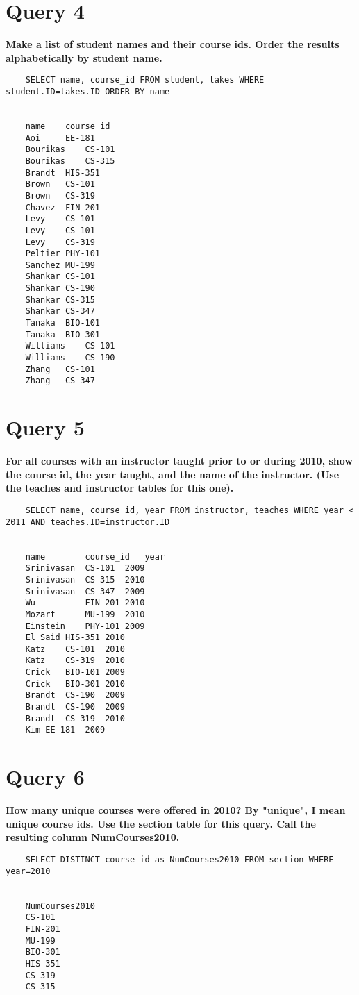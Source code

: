 \documentclass[letterpaper]{article}
\begin{document}
\section{Query 4}

    \textbf{Make a list of student names and their course ids.  Order the results alphabetically by student name.}
    \begin{lstlisting}
    SELECT name, course_id FROM student, takes WHERE student.ID=takes.ID ORDER BY name


    name   	course_id	
    Aoi	    EE-181	
    Bourikas	CS-101	
    Bourikas	CS-315	
    Brandt	HIS-351	
    Brown	CS-101	
    Brown	CS-319	
    Chavez	FIN-201	
    Levy	CS-101	
    Levy	CS-101	
    Levy	CS-319	
    Peltier	PHY-101	
    Sanchez	MU-199	
    Shankar	CS-101	
    Shankar	CS-190	
    Shankar	CS-315	
    Shankar	CS-347	
    Tanaka	BIO-101	
    Tanaka	BIO-301	
    Williams	CS-101	
    Williams	CS-190	
    Zhang	CS-101	
    Zhang	CS-347
    \end{lstlisting}
        
\section{Query 5}

    \textbf{For all courses with an instructor taught prior to or during 2010, show the course id, the year taught, and the name of the instructor.  (Use the teaches and instructor tables for this one).}
    \begin{lstlisting}
    SELECT name, course_id, year FROM instructor, teaches WHERE year < 2011 AND teaches.ID=instructor.ID


    name	    course_id	year	
    Srinivasan	CS-101	2009	
    Srinivasan	CS-315	2010	
    Srinivasan	CS-347	2009	
    Wu	        FIN-201	2010	
    Mozart	    MU-199	2010	
    Einstein	PHY-101	2009	
    El Said	HIS-351	2010	
    Katz	CS-101	2010	
    Katz	CS-319	2010	
    Crick	BIO-101	2009	
    Crick	BIO-301	2010	
    Brandt	CS-190	2009	
    Brandt	CS-190	2009	
    Brandt	CS-319	2010	
    Kim	EE-181	2009
    \end{lstlisting}
        
\section{Query 6}

    \textbf{How many unique courses were offered in 2010?  By "unique", I mean unique course ids.   Use the section table for this query.  Call the resulting column NumCourses2010.}
    \begin{lstlisting}
    SELECT DISTINCT course_id as NumCourses2010 FROM section WHERE year=2010
    
    
    NumCourses2010	
    CS-101	
    FIN-201	
    MU-199	
    BIO-301	
    HIS-351	
    CS-319	
    CS-315	
    \end{lstlisting}
        
\end{document}
